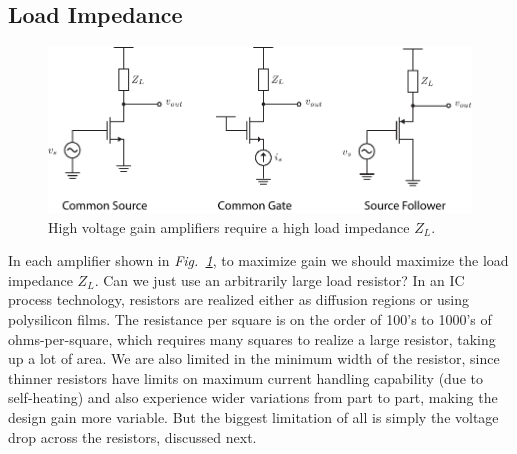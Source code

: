 \subsection{Load Impedance}
\begin{figure}[tb]
\centering
\includegraphics[width=1\columnwidth]{0highZload.pdf}
\caption{High voltage gain amplifiers require a high load impedance $Z_L$.}
\label{fig:0highZload.pdf}
\end{figure}
In each amplifier shown in \emph{Fig.~\ref{fig:0highZload.pdf}}, to maximize gain we should maximize the load impedance $Z_L$.   Can we just use an arbitrarily large load resistor?  In an IC process technology, resistors are realized either as diffusion regions or using polysilicon films.  The resistance per square is on the order of 100's to 1000's of ohms-per-square, which requires many squares to realize a large resistor, taking up a lot of area.  We are also limited in the minimum width of the resistor, since thinner resistors have limits on maximum current handling capability (due to self-heating) and also experience wider variations from part to part, making the design gain more variable.  But the biggest limitation of all is simply the voltage drop across the resistors, discussed next. 
